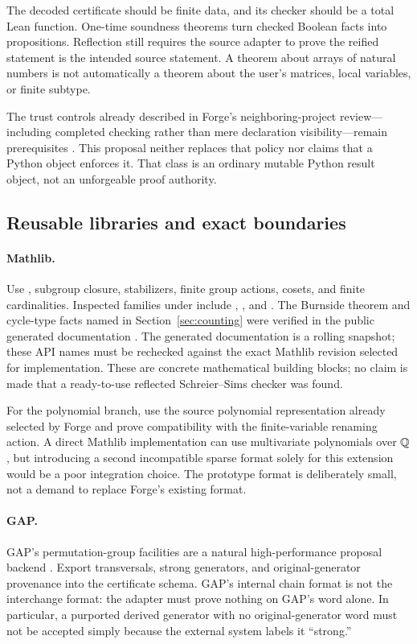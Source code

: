 The decoded certificate should be finite data, and its checker should be a total Lean function. One-time soundness theorems turn checked Boolean facts into propositions. Reflection still requires the source adapter to prove the reified statement is the intended source statement. A theorem about arrays of natural numbers is not automatically a theorem about the user's matrices, local variables, or finite subtype.

The trust controls already described in Forge's neighboring-project review---including completed checking rather than mere declaration visibility---remain prerequisites \cite{forge-neighbors}. This proposal neither replaces that policy nor claims that a Python  object enforces it. That class is an ordinary mutable Python result object, not an unforgeable proof authority.

\subsection{Reusable libraries and exact boundaries}
\paragraph{Mathlib.}
Use , subgroup closure, stabilizers, finite group actions, cosets, and finite cardinalities. Inspected families under  include , , and . The Burnside theorem and cycle-type facts named in Section~\ref{sec:counting} were verified in the public generated documentation \cite{mathlib-burnside,mathlib-cycles}. The generated documentation is a rolling snapshot; these API names must be rechecked against the exact Mathlib revision selected for implementation. These are concrete mathematical building blocks; no claim is made that a ready-to-use reflected Schreier--Sims checker was found.

For the polynomial branch, use the source polynomial representation already selected by Forge and prove compatibility with the finite-variable renaming action. A direct Mathlib implementation can use multivariate polynomials over $\mathbb Q$, but introducing a second incompatible sparse format solely for this extension would be a poor integration choice. The prototype format is deliberately small, not a demand to replace Forge's existing format.

\paragraph{GAP.}
GAP's permutation-group facilities are a natural high-performance proposal backend \cite{gap}. Export transversals, strong generators, and original-generator provenance into the certificate schema. GAP's internal chain format is not the interchange format: the adapter must prove nothing on GAP's word alone. In particular, a purported derived generator with no original-generator word must not be accepted simply because the external system labels it ``strong.''

